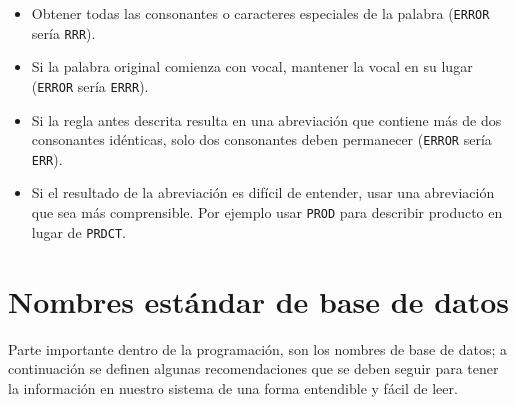 \begin{itemize}
  \begin{itemize}

  \item Obtener todas las consonantes o caracteres especiales de la palabra
    (\texttt{ERROR} sería \texttt{RRR}).

  \item Si la palabra original comienza con vocal, mantener la vocal en su lugar
    (\texttt{ERROR} sería \texttt{ERRR}).

  \item Si la regla antes descrita resulta en una abreviación que contiene más
    de dos consonantes idénticas, solo dos consonantes deben permanecer
    (\texttt{ERROR} sería \texttt{ERR}).

  \item Si el resultado de la abreviación es difícil de entender, usar una
    abreviación que sea más comprensible. Por ejemplo usar \texttt{PROD} para
    describir producto en lugar de \texttt{PRDCT}.

  \end{itemize}

\end{itemize}
\section{Nombres estándar de base de datos}
Parte importante dentro de la programación, son los nombres de base de datos; a continuación se definen algunas recomendaciones que se deben seguir 
para tener la información en nuestro sistema de una forma entendible y fácil de leer.

